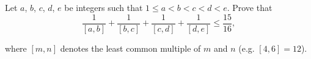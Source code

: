 Let $a$,  $b$,  $c$,  $d$,  $e$ be integers such that $1 \le a < b < c < d < e$.  Prove that\[\frac{1}{[a,b]} + \frac{1}{[b,c]} + \frac{1}{[c,d]} + \frac{1}{[d,e]} \le \frac{15}{16},\]

where $[m,n]$ denotes the least common multiple of $m$ and $n$ (e.g. $[4,6] = 12$).